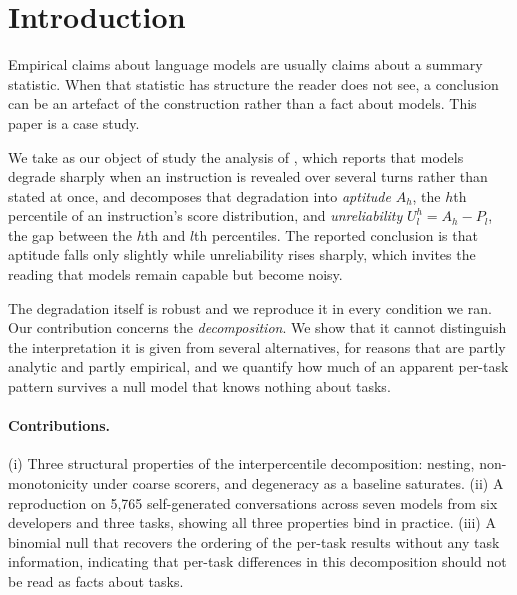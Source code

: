 \documentclass{article}
\begin{document}
\section{Introduction}

Empirical claims about language models are usually claims about a summary statistic. When that
statistic has structure the reader does not see, a conclusion can be an artefact of the
construction rather than a fact about models. This paper is a case study.

We take as our object of study the analysis of \citet{laban2025lost}, which reports that models
degrade sharply when an instruction is revealed over several turns rather than stated at once, and
decomposes that degradation into \emph{aptitude} $A_h$, the $h$th percentile of an instruction's
score distribution, and \emph{unreliability} $U^h_l = A_h - P_l$, the gap between the $h$th and
$l$th percentiles. The reported conclusion is that aptitude falls only slightly while unreliability
rises sharply, which invites the reading that models remain capable but become noisy.

The degradation itself is robust and we reproduce it in every condition we ran. Our contribution
concerns the \emph{decomposition}. We show that it cannot distinguish the interpretation it is
given from several alternatives, for reasons that are partly analytic and partly empirical, and we
quantify how much of an apparent per-task pattern survives a null model that knows nothing about
tasks.

\paragraph{Contributions.} (i) Three structural properties of the interpercentile decomposition:
nesting, non-monotonicity under coarse scorers, and degeneracy as a baseline saturates. (ii) A
reproduction on 5{,}765 self-generated conversations across seven models from six developers and three tasks,
showing all three properties bind in practice. (iii) A binomial null that recovers the ordering of
the per-task results without any task information, indicating that per-task differences in this
decomposition should not be read as facts about tasks.
\end{document}
